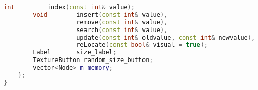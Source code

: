 \begin{lstlisting}[language=C++]
        int         index(const int& value);
        void        insert(const int& value),
                    remove(const int& value),
                    search(const int& value),
                    update(const int& oldvalue, const int& newvalue),
                    reLocate(const bool& visual = true);
        Label       size_label;
        TextureButton random_size_button;
        vector<Node> m_memory;
    };
}






\end{lstlisting}

